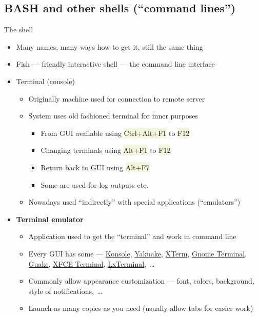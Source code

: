 \documentclass[compress, xelatex, 11pt, xcolor=svgnames, aspectratio=169,
	hyperref={
		bookmarks=true,
		unicode=true,
		colorlinks=true,
		pdftitle={Linux, command line and MetaCentrum},
		plainpages=false,
		pdfauthor={Vojtech Zeisek},
		pdfsubject={Course about use of Linux command line, writing shell scripts and using MetaCentrum of CESNET},
		pdfcreator={XeLaTeX},
		pdfkeywords={Linux, GNU, BASH, shell, command line, MetaCentrum},
		linkcolor=DarkRed, %
		anchorcolor=DarkBlue, %
		citecolor=Indigo, %
		filecolor=NavyBlue, %
		menucolor=DarkMagenta, %
		urlcolor=DarkBlue, %
		},
	url={hyphens, lowtilde} %
	]{beamer}
\renewcommand{\texttt}[1]{\colorbox{Beige}{{\ttfamily #1}}}
\begin{document}
\subsection[SH]{BASH and other shells (\enquote{command lines})}

\begin{frame}{The shell}
	\begin{itemize}
		\item Many names, many ways how to get it, still the same thing
		\item Fish --- friendly interactive shell --- the command line interface
		\item Terminal (console)
		\begin{itemize}
			\item Originally machine used for connection to remote server
			\item System uses old fashioned terminal for inner purposes
			\begin{itemize}
				\item From GUI available using \texttt{Ctrl+Alt+F1} to \texttt{F12}
				\item Changing terminals using \texttt{Alt+F1} to \texttt{F12}
				\item Return back to GUI using \texttt{Alt+F7}
				\item Some are used for log outputs etc.
			\end{itemize}
			\item Nowadays used \enquote{indirectly} with special applications (\enquote{emulators})
		\end{itemize}
		\item \textbf{Terminal emulator}
		\begin{itemize}
			\item Application used to get the \enquote{terminal} and work in command line
			\item Every GUI has some --- \href{https://konsole.kde.org/}{Konsole}, \href{https://apps.kde.org/yakuake}{Yakuake}, \href{https://invisible-island.net/xterm/}{XTerm}, \href{https://wiki.gnome.org/Apps/Terminal}{Gnome Terminal}, \href{http://guake.org/}{Guake}, \href{https://docs.xfce.org/apps/terminal/start}{XFCE Terminal}, \href{https://github.com/lxde/lxterminal}{LxTerminal},~\ldots
			\item Commonly allow appearance customization --- font, colors, background, style of notifications,~\ldots
			\item Launch as many copies as you need (usually allow tabs for easier work)
		\end{itemize}
	\end{itemize}
\end{frame}
\end{document}
